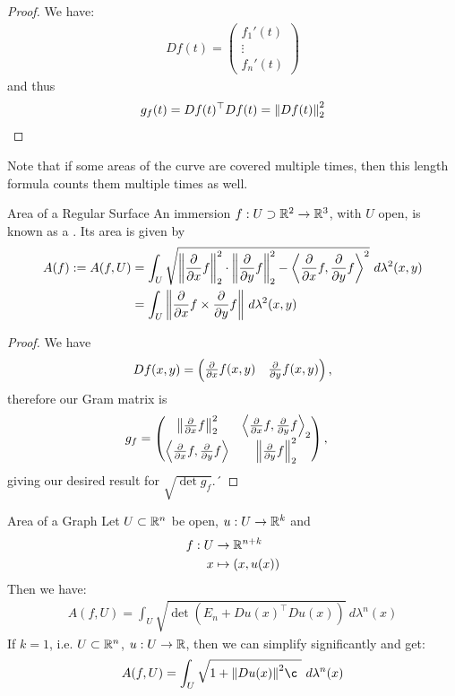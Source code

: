 \begin{proof}
	We have:
	\begin{align*}
		Df(t) = 
		\begin{pmatrix}
			f_1'(t)\\
			\vdots\\
			f_n'(t)
		\end{pmatrix}
	\end{align*}
	and thus
	\begin{align*}
		g_f(t) = Df(t)^\top Df(t) = \norm{Df(t)}_2^2
	\end{align*}
\end{proof}
Note that if some areas of the curve are covered multiple times, then this length formula counts them multiple times as well.
\begin{importantcorollary}{Area of a Regular Surface}{}
	An immersion $f : U \supset \mathbb{R}^2 \to \mathbb{R}^3$, with $U$ open, is known as a . Its area is given by
	\begin{align*}
		A(f) := A(f,U) 
		&= \int_U \sqrt{\norm{\pdv{x}f}_2^2 \cdot \norm{\pdv{y}f}_2^2 - \left\langle \pdv{x} f, \pdv{y}f \right\rangle^2} ~d\lambda^2(x,y)\\
		&= \int_U \norm{\pdv{x}f \times \pdv{y} f} ~d\lambda^2(x,y)\\
	\end{align*}
\end{importantcorollary}
\begin{proof}
	We have
	\begin{align*}
		Df(x,y) = 
		\begin{pmatrix}
			\pdv{x} f(x,y) & \pdv{y} f(x,y)
		\end{pmatrix},
	\end{align*}
	therefore our Gram matrix is
	\begin{align*}
		g_f
		&=
		\begin{pmatrix}
			\norm{\pdv{x}f}_2^2 & \left\langle \pdv{x} f, \pdv{y}f \right\rangle_2\\
			\left\langle \pdv{x} f, \pdv{y}f \right\rangle & \norm{\pdv{y}f}_2^2
		\end{pmatrix},
	\end{align*}
	giving our desired result for $\sqrt{\det g_f}$.´
\end{proof}
\begin{importanttheorem}{Area of a Graph}{}
	Let $U \subset \mathbb{R}^n$ be open, $u : U \to \mathbb{R}^k$ and
	\begin{align*}
		f : U &\to \mathbb{R}^{n+k}\\
		x &\mapsto (x, u(x))
	\end{align*}
	Then we have:
	\begin{align*}
		A(f,U) = \int_U \sqrt{\det(E_n + Du(x)^\top Du(x))} ~d\lambda^n(x)
	\end{align*}
	If $k = 1$, i.e. $U \subset \mathbb{R}^n$, $u : U \to \mathbb{R}$, then we can simplify significantly and get:
	\begin{align*}
		A(f,U) = \int_U \sqrt{1 + \norm{Du(x)}^2¸} ~d\lambda^n(x)
	\end{align*}
\end{importanttheorem}
